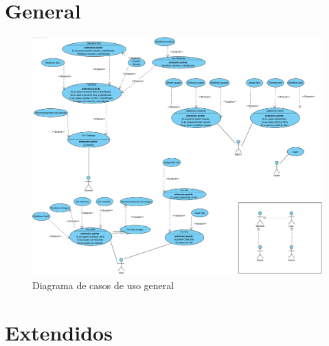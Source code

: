 ﻿\documentclass{report}
\begin{document}
        \section{General}
            \begin{figure}[H]
                \centering
                \includegraphics[scale=0.3]{img/casos_uso/General.png}
                \caption{Diagrama de casos de uso general}
            \end{figure}
        \clearpage
        \section{Extendidos}
\end{document}
